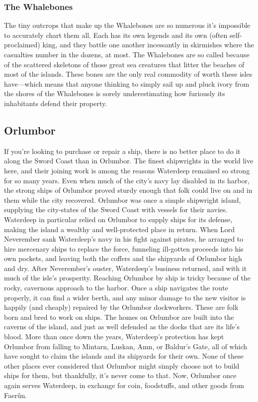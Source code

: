 \documentclass[10pt,a4paper,twoside,twocolumn,openany,bg=print,nodeprecatedcode]{dndbook}
\begin{document}
\subsubsection{The Whalebones}
The tiny outcrops that make up the Whalebones are so numerous it's impossible to accurately chart them all. Each has its own legends and its own (often self-proclaimed) king, and they battle one another incessantly in skirmishes where the casualties number in the dozens, at most.
The Whalebones are so called because of the scattered skeletons of those great sea creatures that litter the beaches of most of the islands. These bones are the only real commodity of worth these isles have—which means that anyone thinking to simply sail up and pluck ivory from the shores of the Whalebones is sorely underestimating how furiously its inhabitants defend their property.
\subsection{Orlumbor}
If you're looking to purchase or repair a ship, there is no better place to do it along the Sword Coast than in Orlumbor. The finest shipwrights in the world live here, and their joining work is among the reasons Waterdeep remained so strong for so many years. Even when much of the city's navy lay disabled in its harbor, the strong ships of Orlumbor proved sturdy enough that folk could live on and in them while the city recovered.
Orlumbor was once a simple shipwright island, supplying the city-states of the Sword Coast with vessels for their navies. Waterdeep in particular relied on Orlumbor to supply ships for its defense, making the island a wealthy and well-protected place in return. When Lord Neverember sank Waterdeep's navy in his fight against pirates, he arranged to hire mercenary ships to replace the force, funneling ill-gotten proceeds into his own pockets, and leaving both the coffers and the shipyards of Orlumbor high and dry. After Neverember's ouster, Waterdeep's business returned, and with it much of the isle's prosperity.
Reaching Orlumbor by ship is tricky because of the rocky, cavernous approach to the harbor. Once a ship navigates the route properly, it can find a wider berth, and any minor damage to the new visitor is happily (and cheaply) repaired by the Orlumbor dockworkers. These are folk born and bred to work on ships. The homes on Orlumbor are built into the caverns of the island, and just as well defended as the docks that are its life's blood.
More than once down the years, Waterdeep's protection has kept Orlumbor from falling to Mintarn, Luskan, Amn, or Baldur's Gate, all of which have sought to claim the islands and its shipyards for their own. None of these other places ever considered that Orlumbor might simply choose not to build ships for them, but thankfully, it's never come to that. Now, Orlumbor once again serves Waterdeep, in exchange for coin, foodstuffs, and other goods from Faerûn.
\end{document}
